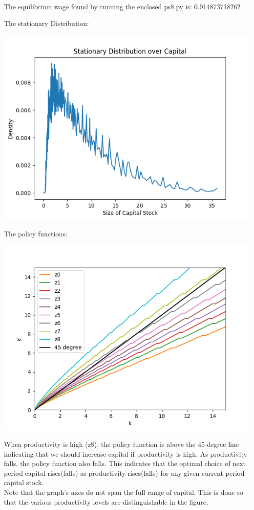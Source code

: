 \documentclass{article}
\begin{document}
The equilibrium wage found by running the enclosed ps8.py is: 0.914873718262

The stationary Distribution:
\begin{center}
\includegraphics[scale = .65]{dist}
\end{center}

The policy functions:
\begin{center}
\includegraphics[scale = .65]{policy}
\end{center}
\newpage

When productivity is high (z8), the policy function is above the 45-degree line indicating that we should increase capital if productivity is high.
As productivity falls, the policy function also falls. This indicates that the optimal choice  of next period capital rises(falls) as productivity rises(falls) for any given current period capital stock.\\

Note that the graph's axes do not span the full range of capital. This is done so that the various productivity levels are distinguishable in the figure. 
\end{document}
